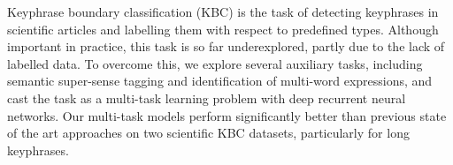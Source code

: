Keyphrase boundary classification (KBC) is the task of detecting keyphrases in scientific articles and labelling them with respect to predefined types. Although important in practice, this task is so far underexplored, partly due to the lack of labelled data. To overcome this, we explore several auxiliary tasks, including semantic super-sense tagging and identification of multi-word expressions, and cast the task as a multi-task learning problem with deep recurrent neural networks. Our multi-task models perform significantly better than previous state of the art approaches on two scientific KBC datasets, particularly for long keyphrases.
